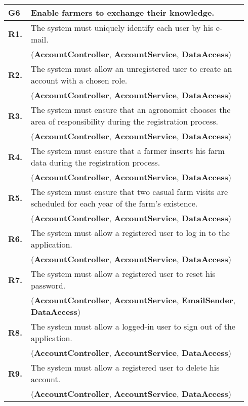 \begin{longtable}{p{0.06\linewidth} p{0.88\linewidth}} 
    \toprule
    \textbf{G6} & Enable farmers to exchange their knowledge. \\ 
    \midrule
    
	\textbf{R1.} & The system must uniquely identify each user by his e-mail. \\
	& (\textbf{AccountController}, \textbf{AccountService}, \textbf{DataAccess})\\
	\textbf{R2.} & The system must allow an unregistered user to create an account with a chosen role. \\
	& (\textbf{AccountController}, \textbf{AccountService}, \textbf{DataAccess})\\
	\textbf{R3.} & The system must ensure that an agronomist chooses the area of responsibility during the registration process. \\
	& (\textbf{AccountController}, \textbf{AccountService}, \textbf{DataAccess})\\
	\textbf{R4.} & The system must ensure that a farmer inserts his farm data during the registration process.\\
	& (\textbf{AccountController}, \textbf{AccountService}, \textbf{DataAccess})\\
	\textbf{R5.} & The system must ensure that two casual farm visits are scheduled for each year of the farm's existence.\\
	& (\textbf{AccountController}, \textbf{AccountService}, \textbf{DataAccess})\\
	\textbf{R6.} & The system must allow a registered user to log in to the application. \\
	& (\textbf{AccountController}, \textbf{AccountService}, \textbf{DataAccess})\\
	\textbf{R7.} & The system must allow a registered user to reset his password. \\
	& (\textbf{AccountController}, \textbf{AccountService}, \textbf{EmailSender}, \textbf{DataAccess})\\
	\textbf{R8.} & The system must allow a logged-in user to sign out of the application. \\
	& (\textbf{AccountController}, \textbf{AccountService}, \textbf{DataAccess})\\
	\textbf{R9.} & The system must allow a registered user to delete his account. \\
	& (\textbf{AccountController}, \textbf{AccountService}, \textbf{DataAccess})\\
	

\end{longtable}
